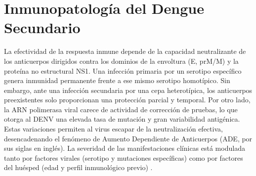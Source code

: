 \section{Inmunopatología del Dengue Secundario}
 La efectividad de la respuesta inmune depende de la capacidad neutralizante de los anticuerpos dirigidos contra los dominios de la envoltura (E, prM/M) y la proteína no estructural NS1. Una infección primaria por un serotipo específico genera inmunidad permanente frente a ese mismo serotipo homotípico. Sin embargo, ante una infección secundaria por una cepa heterotípica, los anticuerpos preexistentes solo proporcionan una protección parcial y temporal. Por otro lado, la ARN polimerasa viral carece de actividad de corrección de pruebas, lo que otorga al DENV una elevada tasa de mutación y gran variabilidad antigénica. Estas variaciones permiten al virus escapar de la neutralización efectiva, desencadenando el fenómeno de Aumento Dependiente de Anticuerpos (ADE, por sus siglas en inglés).
La severidad de las manifestaciones clínicas está modulada tanto por factores virales (serotipo y mutaciones específicas) como por factores del huésped (edad y perfil inmunológico previo) \cite{dhole2024host}.

